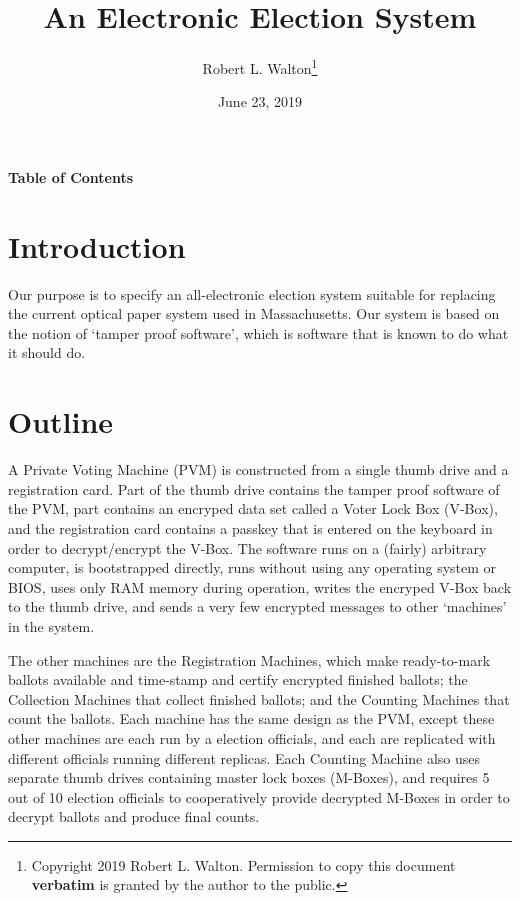 \documentclass[12pt]{article}
\makeatletter
\renewcommand\tableofcontents{%
    \begin{list}{}%
	     {\setlength{\itemsep}{0in}%
	      \setlength{\topsep}{0in}%
	      \setlength{\parsep}{1ex}%
	      \setlength{\labelwidth}{0in}%
	      \setlength{\baselineskip}{1.5ex}%
	      \setlength{\leftmargin}{0.8in}%
	      \setlength{\rightmargin}{0.8in}}%
    \item\@starttoc{toc}%
    \end{list}}
\makeatother
\begin{document}
        
\title{An Electronic Election System}

\author{Robert L. Walton\thanks{Copyright 2019 Robert L. Walton.
Permission to copy this document {\bf verbatim} is granted by the author
to the public.}}

\date{June 23, 2019}

\maketitle

\begin{center}
\large \bf Table of Contents
\end{center}

\bigskip

\tableofcontents 

\newpage

\section{Introduction}

Our purpose is to specify an all-electronic election system
suitable for replacing the current optical paper system
used in Massachusetts.  Our system is based on the notion
of `tamper proof software', which is software that is
known to do what it should do.

\section{Outline}

A Private Voting Machine
(PVM) is constructed from a single thumb drive and a
registration card.  Part of the thumb drive contains the
tamper proof software of the PVM, part contains an encryped
data set called a Voter Lock Box (V-Box), and the registration
card contains a passkey that is entered on the keyboard in
order to decrypt/encrypt the V-Box.  The software runs on
a (fairly) arbitrary computer, is bootstrapped directly,
runs without using any operating system or BIOS,
uses only RAM memory during operation,
writes the encryped V-Box back to the thumb drive, and sends
a very few encrypted messages to other `machines' in the
system.

The other machines are the Registration Machines, which make
ready-to-mark ballots available and time-stamp and certify
encrypted finished ballots; the Collection Machines that collect
finished ballots; and the Counting Machines that count the
ballots.  Each machine has the same design as the PVM, except
these other machines are each run by a election officials, and
each are replicated with different officials running different
replicas.  Each Counting Machine also uses separate
thumb drives containing master lock boxes
(M-Boxes), and requires 5 out of 10 election officials to cooperatively
provide decrypted M-Boxes in order to decrypt ballots and
produce final counts.
\end{document}
